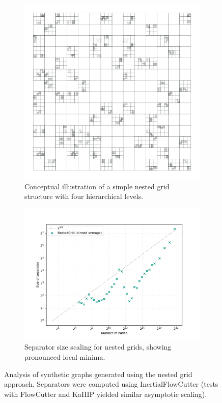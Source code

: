 \begin{figure}[tbhp]
	\centering
	\begin{subfigure}{0.35\linewidth}
		\centering
		\includegraphics[width=\linewidth]{graphics/nestedgrid.pdf}
		\caption{Conceptual illustration of a simple nested grid structure with four hierarchical levels.}
		\label{fig:nested_grid_viz}
	\end{subfigure}
	\hfill
	\begin{subfigure}{0.55\linewidth}
		\centering
		\includegraphics[width=\linewidth]{graphics/sep-nestedgrid.pdf}
		\caption{Separator size scaling for nested grids, showing pronounced local minima.}
		\label{fig:nested_grid_sep_plot}
	\end{subfigure}
	\caption{Analysis of synthetic graphs generated using the nested grid approach. Separators were computed using InertialFlowCutter (tests with FlowCutter and KaHIP yielded similar asymptotic scaling).}
	\label{fig:nested_grid_analysis}
\end{figure}

